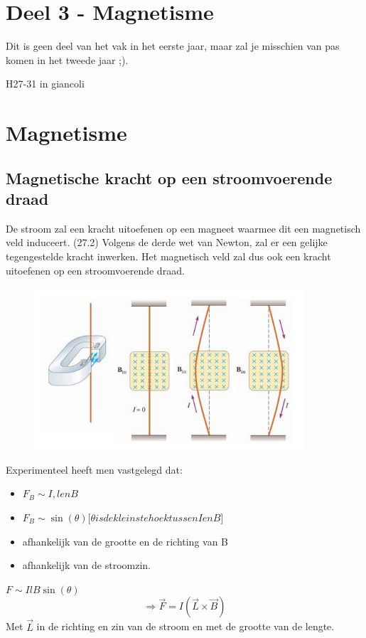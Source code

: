 \documentclass[12pt,a4paper]{article}
\begin{document}
    \section{Deel 3 - Magnetisme}
    Dit is geen deel van het vak in het eerste jaar, maar zal je misschien van pas komen in het tweede jaar ;).
    
    H27-31 in giancoli
    \section{Magnetisme}
    \subsection{Magnetische kracht op een stroomvoerende draad}
    De stroom zal een kracht uitoefenen op een magneet waarmee dit een magnetisch veld induceert. (27.2) Volgens de derde wet van Newton, zal er een gelijke tegengestelde kracht inwerken. Het magnetisch veld zal dus ook een kracht uitoefenen op een stroomvoerende draad. 
    \begin{figure}[h]
    	\centering
    	\includegraphics[width=0.6\linewidth]{images/27.3}
    \end{figure}

    Experimenteel heeft men vastgelegd dat: 
    \begin{itemize}
    	\renewcommand\labelitemi{--}
    	\item \(F_B \sim I, l en B\)
    	\item \(F_B \sim \sin(\theta)\)[\(\theta is de kleinste hoek tussen I en B\)]
    	\item afhankelijk van de grootte en de richting van B
    	\item afhankelijk van de stroomzin. 
    \end{itemize}
	\(F \sim IlB\sin(\theta)\)
	\[\Rightarrow \vec{F} = I(\vec{L}\times\vec{B})\]
	Met $\vec{L}$ in de richting en zin van de stroom en met de grootte van de lengte.
	
\end{document}
